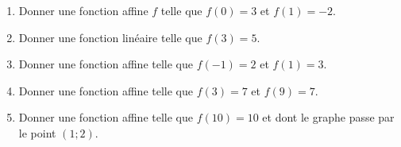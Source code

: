 
\begin{exercice}\label{exosmath-0151}

    \begin{enumerate}
        \item
Donner une fonction affine \( f\) telle que \( f(0)=3\) et \( f(1)=-2\).
\item
    Donner une fonction linéaire telle que \( f(3)=5\).
\item
    Donner une fonction affine telle que \( f(-1)=2\) et \( f(1)=3\).
\item
    Donner une fonction affine telle que \( f(3)=7\) et \( f(9)=7\).
\item
    Donner une fonction affine telle que \( f(10)=10\) et dont le graphe passe par le point \( (1;2)\).
    \end{enumerate}

\end{exercice}
